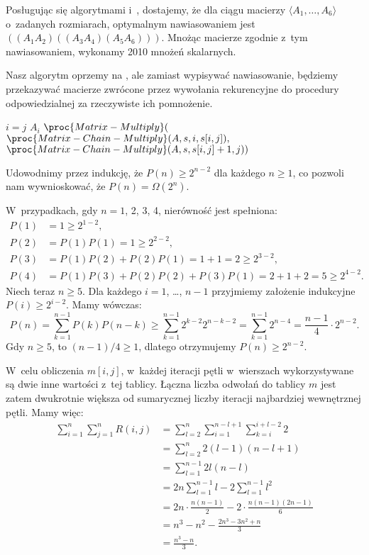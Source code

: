 
\exercise %
Posługując się algorytmami  i~, dostajemy, że dla ciągu macierzy $\langle A_1,\dots,A_6\rangle$ o~zadanych rozmiarach, optymalnym nawiasowaniem jest $((A_1A_2)((A_3A_4)(A_5A_6)))$.
Mnożąc macierze zgodnie z~tym nawiasowaniem, wykonamy 2010 mnożeń skalarnych.

\exercise %
Nasz algorytm oprzemy na , ale zamiast wypisywać nawiasowanie, będziemy przekazywać macierze zwrócone przez wywołania rekurencyjne do procedury odpowiedzialnej za rzeczywiste ich pomnożenie.
\begin{codebox}
\li	\If $i=j$
\li		\Then \Return $A_i$
		\End
\li	\Return $\proc{Matrix-Multiply}($
\zi	\>\>\> $\proc{Matrix-Chain-Multiply}(A,s,i,s[i,j]),$
\zi	\>\>\> $\proc{Matrix-Chain-Multiply}(A,s,s[i,j]+1,j))$
\end{codebox}

\exercise %
Udowodnimy przez indukcję, że $P(n)\ge2^{n-2}$ dla każdego $n\ge1$, co pozwoli nam wywnioskować, że $P(n)=\Omega(2^n)$.

W~przypadkach, gdy $n=1$, 2, 3, 4, nierówność jest spełniona:
\begin{align*}
	P(1) &= 1 \ge 2^{1-2}, \\
	P(2) &= P(1)P(1) = 1 \ge 2^{2-2}, \\
	P(3) &= P(1)P(2)+P(2)P(1) = 1+1 = 2 \ge 2^{3-2}, \\
	P(4) &= P(1)P(3)+P(2)P(2)+P(3)P(1) = 2+1+2 = 5 \ge 2^{4-2}.
\end{align*}
Niech teraz $n\ge5$.
Dla każdego $i=1$, \dots, $n-1$ przyjmiemy założenie indukcyjne $P(i)\ge2^{i-2}$.
Mamy wówczas:
\[
	P(n) = \sum_{k=1}^{n-1}P(k)P(n-k) \ge \sum_{k=1}^{n-1}2^{k-2}2^{n-k-2} = \sum_{k=1}^{n-1}2^{n-4} = \frac{n-1}{4}\cdot2^{n-2}.
\]
Gdy $n\ge5$, to $(n-1)/4\ge1$, dlatego otrzymujemy $P(n)\ge2^{n-2}$.

\exercise %
W~celu obliczenia $m[i,j]$, w~każdej iteracji pętli  w~wierszach  wykorzystywane są dwie inne wartości z~tej tablicy.
Łączna liczba odwołań do tablicy $m$ jest zatem dwukrotnie większa od sumarycznej liczby iteracji najbardziej wewnętrznej pętli.
Mamy więc:
\begin{align*}
	\sum_{i=1}^n\sum_{j=1}^nR(i,j) &= \sum_{l=2}^n\sum_{i=1}^{n-l+1}\sum_{k=i}^{i+l-2}2 \\
	&= \sum_{l=2}^n2(l-1)(n-l+1) \\
	&= \sum_{l=1}^{n-1}2l(n-l) \\
	&= 2n\sum_{l=1}^{n-1}l-2\sum_{l=1}^{n-1}l^2 \\
	&= 2n\cdot\frac{n(n-1)}{2}-2\cdot\frac{n(n-1)(2n-1)}{6} \\
	&= n^3-n^2-\frac{2n^3-3n^2+n}{3} \\
	&= \frac{n^3-n}{3}.
\end{align*}

